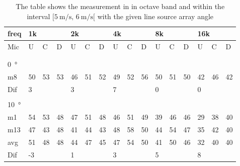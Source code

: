 \begin{table}[H]
\centering
\caption{The table shows the measurement in in octave band and within the interval $[\SI{5}{\meter\per\second},\, \SI{6}{\meter\per\second}[ $ with the given line source array angle}
\begin{tabular}{l|l|l|l|l|l|l|l|l|l|l|l|l|lll}
freq & \multicolumn{3}{l|}{1k} & \multicolumn{3}{l|}{2k} & \multicolumn{3}{l|}{4k} & \multicolumn{3}{l|}{8k} & \multicolumn{3}{l}{16k}                                \\ \hline
Mic  & U      & C      & D     & U      & C      & D     & U      & C      & D     & U      & C      & D     & \multicolumn{1}{l|}{U}  & \multicolumn{1}{l|}{C}  & D  \\ \hline
 & \multicolumn{3}{l|}{} & \multicolumn{3}{l|}{} & \multicolumn{3}{l|}{} & \multicolumn{3}{l|}{} & \multicolumn{3}{l}{}                                \\ 
 \multicolumn{16}{l}{ } \\   
\SI{0}{\degree}   & \multicolumn{3}{l|}{} & \multicolumn{3}{l|}{} & \multicolumn{3}{l|}{} & \multicolumn{3}{l|}{} & \multicolumn{3}{l}{}   \\  \hline
m8   & 50     & 53     & 53    & 46     & 51     & 52    & 49     & 52     & 56    & 50     & 51     & 50    & \multicolumn{1}{l|}{42} & \multicolumn{1}{l|}{46} & 42 \\ \hline 
Dif & \multicolumn{3}{l|}{3} & \multicolumn{3}{l|}{3} & \multicolumn{3}{l|}{7} & \multicolumn{3}{l|}{0} & \multicolumn{3}{l}{0} \\ 
 \multicolumn{16}{l}{ } \\                             
\SI{10}{\degree}   & \multicolumn{3}{l|}{} & \multicolumn{3}{l|}{} & \multicolumn{3}{l|}{} & \multicolumn{3}{l|}{} & \multicolumn{3}{l}{}   \\  \hline
m1   & 54     &  53    & 48    &  47    &   51   &  48   &  46    &  51    &   49  &  39    &  46    &  46   & \multicolumn{1}{l|}{29} & \multicolumn{1}{l|}{38} &  40\\ 
m13   &  47    &  43    & 48    & 41     &  44    &  43   &  48    &  58    & 50    & 44     &  54    &  47   & \multicolumn{1}{l|}{35} & \multicolumn{1}{l|}{42} &  40\\ \hline
avg & 51     & 48     & 48   &  44    & 47     &  45   &   47   & 54     &  50   &  41    &  50    & 46    & \multicolumn{1}{l|}{32} & \multicolumn{1}{l|}{40} & 40 \\ \hline 
Dif & \multicolumn{3}{l|}{-3} & \multicolumn{3}{l|}{1} & \multicolumn{3}{l|}{3} & \multicolumn{3}{l|}{5} & \multicolumn{3}{l}{8}      \\ 

\end{tabular}
\end{table}
